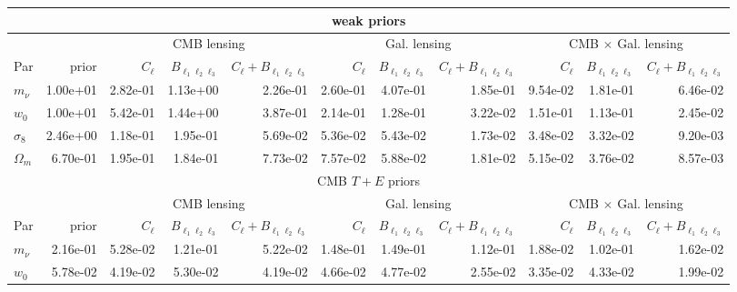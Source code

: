 \documentclass[11pt]{article} %
\begin{document}
\begin{table}
    \centering
    \scriptsize
    \begin{tabular}{|l|r|rrr|rrr|rrr|}
        \hline
        \multicolumn{11}{|c|}{weak priors} \\
        \hline
        && \multicolumn{3}{c|}{CMB lensing}& \multicolumn{3}{c|}{Gal. lensing}& \multicolumn{3}{c|}{CMB $\times$ Gal. lensing} \\
        \hline
        Par            &   prior &   $C_\ell$ &   $B_{\ell_1\ell_2\ell_3}$ &   $C_\ell + B_{\ell_1\ell_2\ell_3}$ &   $C_\ell$ &   $B_{\ell_1\ell_2\ell_3}$ &   $C_\ell + B_{\ell_1\ell_2\ell_3}$ &   $C_\ell$ &   $B_{\ell_1\ell_2\ell_3}$ &   $C_\ell + B_{\ell_1\ell_2\ell_3}$ \\
        \hline
        $m_\nu$    &     1.00e+01 &  2.82e-01 &  1.13e+00 &        2.26e-01 & 2.60e-01 & 4.07e-01 &      1.85e-01 &      9.54e-02 &      1.81e-01 &             6.46e-02 \\
        $w_0$      &     1.00e+01 &  5.42e-01 &  1.44e+00 &        3.87e-01 & 2.14e-01 & 1.28e-01 &      3.22e-02 &      1.51e-01 &      1.13e-01 &             2.45e-02 \\
        $\sigma_8$ &     2.46e+00 &  1.18e-01 &  1.95e-01 &        5.69e-02 & 5.36e-02 & 5.43e-02 &      1.73e-02 &      3.48e-02 &      3.32e-02 &             9.20e-03 \\
        $\Omega_m$ &     6.70e-01 &  1.95e-01 &  1.84e-01 &        7.73e-02 & 7.57e-02 & 5.88e-02 &      1.81e-02 &      5.15e-02 &      3.76e-02 &             8.57e-03 \\
       \hline
        \multicolumn{11}{|c|}{CMB $T + E$ priors} \\
        \hline
        && \multicolumn{3}{c|}{CMB lensing}& \multicolumn{3}{c|}{Gal. lensing}& \multicolumn{3}{c|}{CMB $\times$ Gal. lensing} \\
        \hline
         Par            &   prior &   $C_\ell$ &   $B_{\ell_1\ell_2\ell_3}$ &   $C_\ell + B_{\ell_1\ell_2\ell_3}$ &   $C_\ell$ &   $B_{\ell_1\ell_2\ell_3}$ &   $C_\ell + B_{\ell_1\ell_2\ell_3}$ &   $C_\ell$ &   $B_{\ell_1\ell_2\ell_3}$ &   $C_\ell + B_{\ell_1\ell_2\ell_3}$ \\
        \hline
        $m_\nu$    &    2.16e-01 &  5.28e-02 &  1.21e-01 &        5.22e-02 & 1.48e-01 & 1.49e-01 &      1.12e-01 &      1.88e-02 &      1.02e-01 &             1.62e-02 \\
        $w_0$      &    5.78e-02 &  4.19e-02 &  5.30e-02 &        4.19e-02 & 4.66e-02 & 4.77e-02 &      2.55e-02 &      3.35e-02 &      4.33e-02 &             1.99e-02 \\

\end{tabular}
\end{table}
\end{document}
